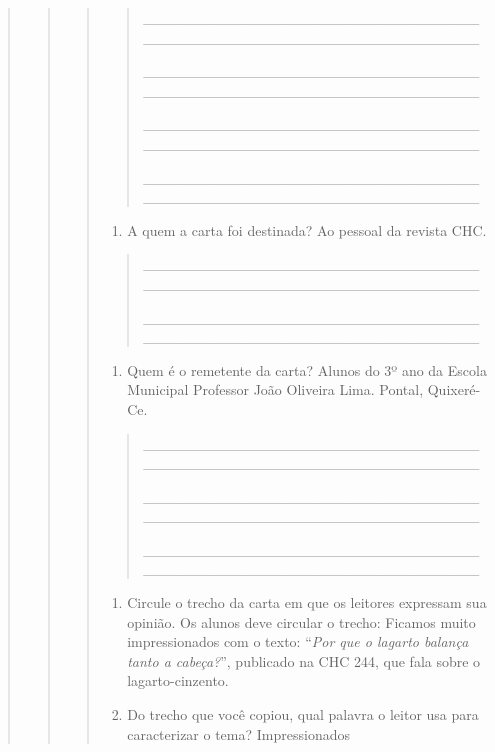 \begin{quote}
\begin{quote}
\begin{quote}
\begin{quote}
\protect\hypertarget{_Hlk127887290}{}{}\_\_\_\_\_\_\_\_\_\_\_\_\_\_\_\_\_\_\_\_\_\_\_\_\_\_\_\_\_\_\_\_\_\_\_\_\_\_\_\_\_\_\_\_\_\_\_\_\_\_\_\_\_\_\_\_\_\_\_\_\_\_\_\_

\_\_\_\_\_\_\_\_\_\_\_\_\_\_\_\_\_\_\_\_\_\_\_\_\_\_\_\_\_\_\_\_\_\_\_\_\_\_\_\_\_\_\_\_\_\_\_\_\_\_\_\_\_\_\_\_\_\_\_\_\_\_\_\_

\_\_\_\_\_\_\_\_\_\_\_\_\_\_\_\_\_\_\_\_\_\_\_\_\_\_\_\_\_\_\_\_\_\_\_\_\_\_\_\_\_\_\_\_\_\_\_\_\_\_\_\_\_\_\_\_\_\_\_\_\_\_\_\_

\_\_\_\_\_\_\_\_\_\_\_\_\_\_\_\_\_\_\_\_\_\_\_\_\_\_\_\_\_\_\_\_\_\_\_\_\_\_\_\_\_\_\_\_\_\_\_\_\_\_\_\_\_\_\_\_\_\_\_\_\_\_\_\_
\end{quote}

\begin{enumerate}
\def\labelenumi{\alph{enumi})}
\item
  A quem a carta foi destinada? Ao pessoal da revista CHC.
\end{enumerate}

\begin{quote}
\_\_\_\_\_\_\_\_\_\_\_\_\_\_\_\_\_\_\_\_\_\_\_\_\_\_\_\_\_\_\_\_\_\_\_\_\_\_\_\_\_\_\_\_\_\_\_\_\_\_\_\_\_\_\_\_\_\_\_\_\_\_\_\_

\_\_\_\_\_\_\_\_\_\_\_\_\_\_\_\_\_\_\_\_\_\_\_\_\_\_\_\_\_\_\_\_\_\_\_\_\_\_\_\_\_\_\_\_\_\_\_\_\_\_\_\_\_\_\_\_\_\_\_\_\_\_\_\_
\end{quote}

\begin{enumerate}
\def\labelenumi{\alph{enumi})}
\item
  Quem é o remetente da carta? Alunos do 3º ano da Escola Municipal
  Professor João Oliveira Lima. Pontal, Quixeré-Ce.
\end{enumerate}

\begin{quote}
\_\_\_\_\_\_\_\_\_\_\_\_\_\_\_\_\_\_\_\_\_\_\_\_\_\_\_\_\_\_\_\_\_\_\_\_\_\_\_\_\_\_\_\_\_\_\_\_\_\_\_\_\_\_\_\_\_\_\_\_\_\_\_\_

\_\_\_\_\_\_\_\_\_\_\_\_\_\_\_\_\_\_\_\_\_\_\_\_\_\_\_\_\_\_\_\_\_\_\_\_\_\_\_\_\_\_\_\_\_\_\_\_\_\_\_\_\_\_\_\_\_\_\_\_\_\_\_\_

\_\_\_\_\_\_\_\_\_\_\_\_\_\_\_\_\_\_\_\_\_\_\_\_\_\_\_\_\_\_\_\_\_\_\_\_\_\_\_\_\_\_\_\_\_\_\_\_\_\_\_\_\_\_\_\_\_\_\_\_\_\_\_\_
\end{quote}

\begin{enumerate}
\def\labelenumi{\alph{enumi})}
\item
  Circule o trecho da carta em que os leitores expressam sua opinião. Os
  alunos deve circular o trecho: Ficamos muito impressionados com o
  texto: ``\emph{Por que o lagarto balança tanto a cabeça?}'', publicado
  na CHC 244, que fala sobre o lagarto-cinzento.
\item
  Do trecho que você copiou, qual palavra o leitor usa para caracterizar
  o tema? Impressionados
\end{enumerate}


\end{quote}
\end{quote}
\end{quote}
